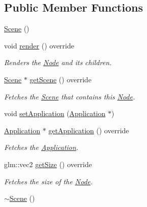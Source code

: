 \subsection*{Public Member Functions}
\begin{DoxyCompactItemize}
\item 
\mbox{\hyperlink{classsage_1_1Scene_ad10176d75a9cc0da56626f682d083507}{Scene}} ()
\item 
void \mbox{\hyperlink{classsage_1_1Scene_a5179bf540ba57931b65668b5b42af10f}{render}} () override
\begin{DoxyCompactList}\small\item\em Renders the \mbox{\hyperlink{classsage_1_1Node}{Node}} and its children. \end{DoxyCompactList}\item 
\mbox{\hyperlink{classsage_1_1Scene}{Scene}} $\ast$ \mbox{\hyperlink{classsage_1_1Scene_ab09415b375ad054825e9fd4d4e471c6b}{get\+Scene}} () override
\begin{DoxyCompactList}\small\item\em Fetches the \mbox{\hyperlink{classsage_1_1Scene}{Scene}} that contains this \mbox{\hyperlink{classsage_1_1Node}{Node}}. \end{DoxyCompactList}\item 
void \mbox{\hyperlink{classsage_1_1Scene_a9c1362c9cef9cd8029f912d4003908c8}{set\+Application}} (\mbox{\hyperlink{classsage_1_1Application}{Application}} $\ast$)
\item 
\mbox{\hyperlink{classsage_1_1Application}{Application}} $\ast$ \mbox{\hyperlink{classsage_1_1Scene_a30ecf9ad001d30773982f0808b05867d}{get\+Application}} () override
\begin{DoxyCompactList}\small\item\em Fetches the \mbox{\hyperlink{classsage_1_1Application}{Application}}. \end{DoxyCompactList}\item 
glm\+::vec2 \mbox{\hyperlink{classsage_1_1Scene_a00e53fc54466062ecc1437b980f5fa69}{get\+Size}} () override
\begin{DoxyCompactList}\small\item\em Fetches the size of the \mbox{\hyperlink{classsage_1_1Node}{Node}}. \end{DoxyCompactList}\item 
\mbox{\hyperlink{classsage_1_1Scene_a3b8cec2e32546713915f8c6303c951f1}{$\sim$\+Scene}} ()
\end{DoxyCompactItemize}
